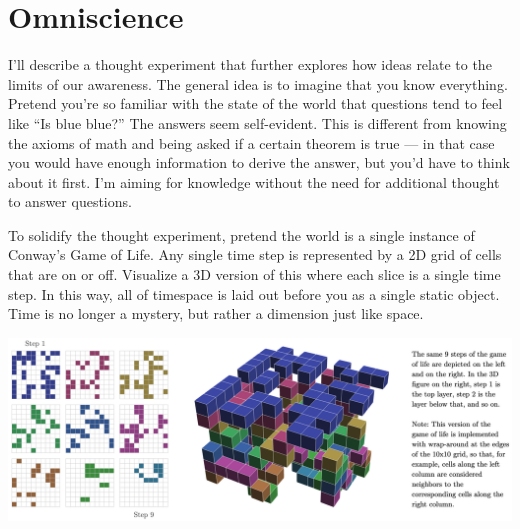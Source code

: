 \documentclass[9pt, twoside]{book}
\theoremstyle{argtstyle}
\begin{document}
%

\section{Omniscience}

I'll describe a thought experiment that further explores
how ideas relate to the limits of our awareness.
The general idea is to imagine that you know everything.
Pretend
you're so familiar with the state of the world that questions tend to
feel like ``Is blue blue?'' The answers seem self-evident.
This is
different from knowing the axioms of math and being asked if a certain theorem
is true --- in that case you would have enough information to derive the answer,
but you'd have to think about it first.
I'm aiming for knowledge without the need for additional thought to answer
questions.

To solidify the thought experiment, pretend the world is a single instance of
Conway's Game of Life. Any single time step is represented by a 2D grid of cells
that are on or off.
Visualize a 3D version of this where each slice is a single time step. In this
way, all of timespace is laid out before you as a single static object. Time is
no longer a mystery, but rather a dimension just like space.

\begin{center}
\includegraphics[width=\textwidth]{gameoflife_3d.png}
\end{center}
\end{document}
